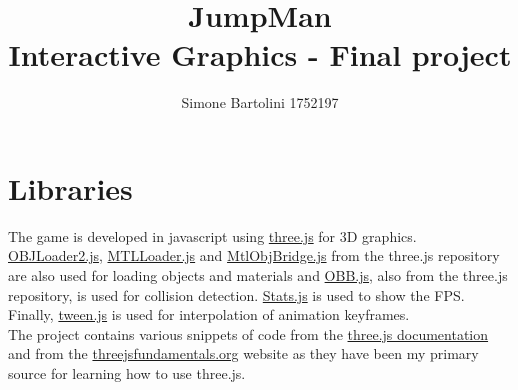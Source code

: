 \documentclass[12pt]{article}
\title{JumpMan \\ \large Interactive Graphics - Final project}
\author{Simone Bartolini 1752197}
\date{}
\begin{document}
\maketitle
\thispagestyle{empty}






\section{Libraries}
The game is developed in javascript using \href{https://threejs.org}{three.js} for 3D graphics. \href{https://github.com/SapienzaInteractiveGraphicsCourse/final-project-jumpman/blob/master/source/three.js-r118/examples/jsm/loaders/OBJLoader2.js}{OBJLoader2.js}, \href{https://github.com/SapienzaInteractiveGraphicsCourse/final-project-jumpman/blob/master/source/three.js-r118/examples/jsm/loaders/MTLLoader.js}{MTLLoader.js} and \href{https://github.com/SapienzaInteractiveGraphicsCourse/final-project-jumpman/blob/master/source/three.js-r118/examples/jsm/loaders/obj2/bridge/MtlObjBridge.js}{MtlObjBridge.js} from the three.js repository are also used for loading objects and materials and \href{https://github.com/SapienzaInteractiveGraphicsCourse/final-project-jumpman/blob/master/source/three.js-r118/examples/jsm/math/OBB.js}{OBB.js}, also from the three.js repository, is used for collision detection. \href{https://github.com/SapienzaInteractiveGraphicsCourse/final-project-jumpman/blob/master/source/three.js-r118/examples/jsm/libs/stats.module.js}{Stats.js} is used to show the FPS. Finally, \href{https://github.com/tweenjs/tween.js}{tween.js} is used for interpolation of animation keyframes. \\
The project contains various snippets of code from the \href{https://threejs.org/docs/index.html#manual/en/introduction/Creating-a-scene}{three.js documentation} and from the \href{https://threejsfundamentals.org}{threejsfundamentals.org} website as they have been my primary source for learning how to use three.js.
\end{document}
